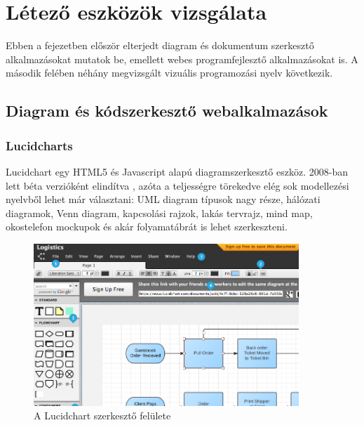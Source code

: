 \chapter{Létező eszközök vizsgálata}


Ebben a fejezetben először elterjedt diagram és dokumentum szerkesztő alkalmazásokat mutatok be, emellett webes programfejlesztő alkalmazásokat is. A második felében néhány megvizsgált vizuális programozási nyelv következik.

\section{Diagram és kódszerkesztő webalkalmazások}

\subsection{Lucidcharts}

Lucidchart egy HTML5 és Javascript alapú diagramszerkesztő eszköz.  2008-ban lett béta verzióként elindítva \cite{lucidref}, azóta a teljességre törekedve elég sok modellezési nyelvből lehet már választani: UML diagram típusok nagy része, hálózati diagramok, Venn diagram, kapcsolási rajzok, lakás tervrajz, mind map, okostelefon mockupok és akár folyamatábrát is lehet szerkeszteni.


\begin{figure}[!ht]
\centering
\includegraphics[width=10cm,keepaspectratio]{figures/lucid.png}
\caption{A Lucidchart szerkesztő felülete}
\label{fig:lucideditor}
\end{figure}

